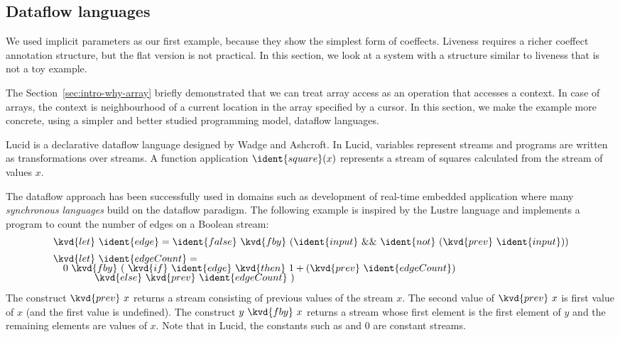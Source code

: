 
\subsection{Dataflow languages}
\label{sec:applications-flat-dataflow}

We used implicit parameters as our first example, because they show the simplest form of coeffects.
Liveness requires a richer coeffect annotation structure, but the flat version is not practical.
In this section, we look at a system with a structure similar to liveness that is not a toy example.

The Section~\ref{sec:intro-why-array} briefly demonstrated that we can treat array access as an
operation that accesses a context. In case of arrays, the context is neighbourhood of a current
location in the array specified by a cursor. In this section, we make the example more concrete,
using a simpler and better studied programming model, dataflow languages.

Lucid \cite{app-lucid} is a declarative dataflow language designed by Wadge and Ashcroft. In Lucid,
variables represent streams and programs are written as transformations over streams. A function
application $\ident{square}(x)$ represents a stream of squares calculated from the stream of values $x$.

The dataflow approach has been successfully used in domains such as development of real-time embedded
application where many \emph{synchronous languages} \cite{app-synchronous-lang} build on the dataflow
paradigm. The following example is inspired by the Lustre \cite{app-synchronous-lustre} language
and implements a program to count the number of edges on a Boolean stream:
%
\begin{equation*}
\begin{array}{l}
\kvd{let}~\ident{edge} = \ident{false}~\kvd{fby}~(\ident{input}~\&\&~\ident{not}~(\kvd{prev}~\ident{input}))
\\[0.5em]
\kvd{let}~\ident{edgeCount} = \\[-0.25em]
\quad 0~\kvd{fby}~ (~\kvd{if}~\ident{edge}~\kvd{then}~1 + (\kvd{prev}~\ident{edgeCount})\\[-0.25em]
\quad\quad\quad~~~\, \kvd{else}~\kvd{prev}~\ident{edgeCount} ~)
\end{array}
\end{equation*}
%
The construct $\kvd{prev}~x$ returns a stream consisting of previous values of the stream
$x$. The second value of $\kvd{prev}~x$ is first value of $x$ (and the first
value is undefined). The construct $y~\kvd{fby}~x$ returns a stream whose first element is the
first element of $y$ and the remaining elements are values of $x$. Note that in Lucid, the constants
such as  and $0$ are constant streams.

